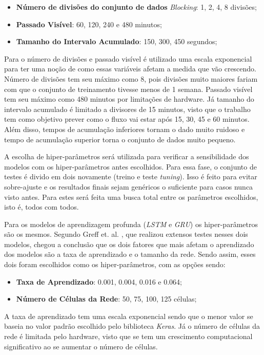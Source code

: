 \begin{itemize}
    \item \textbf{Número de divisões do conjunto de dados} \textit{Blocking}: 1, 2, 4, 8 divisões;
    \item \textbf{Passado Visível}: 60, 120, 240 e 480 minutos;
    \item \textbf{Tamanho do Intervalo Acumulado}: 150, 300, 450 segundos;
\end{itemize}

Para o número de divisões e passado visível é utilizado uma escala exponencial para ter uma noção de como essas variáveis afetam a medida que vão crescendo. Número de divisões tem seu máximo como 8, pois divisões muito maiores fariam com que o conjunto de treinamento tivesse menos de 1 semana. Passado visível tem seu máximo como 480 minutos por limitações de hardware. Já tamanho do intervalo acumulado é limitado a divisores de 15 minutos, visto que o trabalho tem como objetivo prever como o fluxo vai estar após 15, 30, 45 e 60 minutos. Além disso, tempos de acumulação inferiores tornam o dado muito ruidoso e tempo de acumulação superior torna o conjunto de dados muito pequeno.

A escolha de hiper-parâmetros será utilizada para verificar a sensibilidade dos modelos com os hiper-parâmetros antes escolhidos. Para essa fase, o conjunto de testes é divido em dois novamente (treino e teste \textit{tuning}). Isso é feito para evitar sobre-ajuste e os resultados finais sejam genéricos o suficiente para casos nunca visto antes. Para estes será feita uma busca total entre os parâmetros escolhidos, isto é, todos com todos. 

Para os modelos de aprendizagem profunda (\textit{\acrshort{LSTM}} e \textit{\acrshort{GRU}}) os hiper-parâmetros são os mesmos. Segundo Greff et. al. \cite{Greff_2015}, que realizou extensos testes nesses dois modelos, chegou a conclusão que os dois fatores que mais afetam o aprendizado dos modelos são a taxa de aprendizado e o tamanho da rede. Sendo assim, esses dois foram escolhidos como os hiper-parâmetros, com as opções sendo:

\begin{itemize}
    \item \textbf{Taxa de Aprendizado}: 0.001, 0.004, 0.016 e 0.064;
    \item \textbf{Número de Células da Rede}: 50, 75, 100, 125 células;
\end{itemize}

A taxa de aprendizado tem uma escala exponencial sendo que o menor valor se baseia no valor padrão escolhido pelo biblioteca \textit{Keras}. Já o número de células da rede é limitada pelo hardware, visto que se tem um crescimento computacional significativo ao se aumentar o número de células. 

